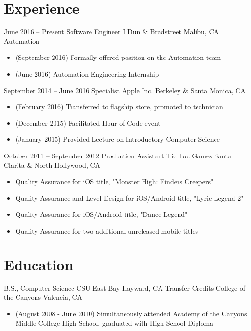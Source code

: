 \documentclass[11pt,a4paper,sans]{moderncv}        %
\begin{document}
\makecvtitle

\section{Experience}		%

\cventry
{June 2016 -- Present}          {Software Engineer I}
{Dun \& Bradstreet}             {Malibu, CA}
{Automation}
{
    \begin{itemize}
    \item (September 2016) Formally offered position on the Automation team
    \item (June 2016) Automation Engineering Internship
    \end{itemize}
}

\cventry
{September 2014 -- June 2016}	{Specialist}
{Apple Inc.}	                {Berkeley \& Santa Monica, CA}
{}
{
  \begin{itemize}
  \item (February 2016) Transferred to flagship store, promoted to technician
  \item (December 2015) Facilitated Hour of Code event
  \item (January 2015) Provided Lecture on Introductory Computer Science
  \end{itemize}
}	%

\cventry
{October 2011 -- September 2012}	{Production Assistant}
{Tic Toc Games}	{Santa Clarita \& North Hollywood, CA}
{}
{
  \begin{itemize}
  \item Quality Assurance for iOS title, "Monster High: Finders Creepers"
  \item Quality Assurance and Level Design for iOS/Android title, "Lyric Legend 2"
  \item Quality Assurance for iOS/Android title, "Dance Legend"
  \item Quality Assurance for two additional unreleased mobile titles
  \end{itemize}
}	%

\section{Education}
  {B.S., Computer Science}
        {CSU East Bay}              {Hayward, CA}               {}{}  %
  {Transfer Credits}
        {College of the Canyons}    {Valencia, CA}              {}
{
  \begin{itemize}
  \item (August 2008 - June 2010) Simultaneously attended Academy of the Canyons Middle College High School, graduated with High School Diploma
  \end{itemize}
}
\end{document}
